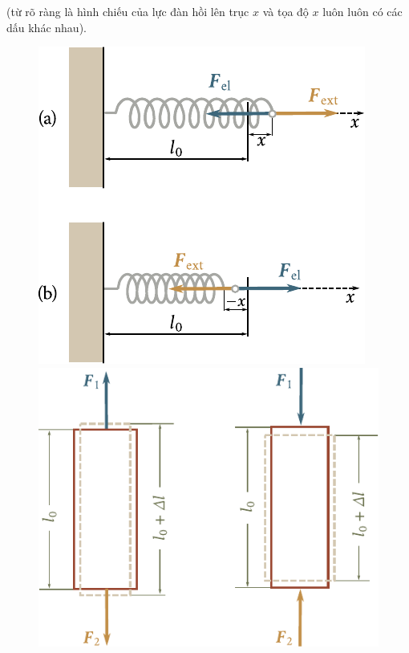 (từ  rõ ràng là hình chiếu của lực đàn hồi lên trục $x$ và tọa độ $x$ luôn luôn có các dấu khác nhau).

\begin{figure}[!htb]
	\begin{minipage}[t]{0.5\linewidth}
		\begin{center}
			\includegraphics[scale=0.75]{figures/ch_02/fig_2_5.pdf}
			\caption[]{}
			\label{fig:2_5}
		\end{center}
	\end{minipage}
	\hspace{-0.05cm}
	\begin{minipage}[t]{0.5\linewidth}
		\begin{center}
			\includegraphics[scale=0.70]{figures/ch_02/fig_2_6.pdf}
			\caption[]{}
			\label{fig:2_6}
		\end{center}
	\end{minipage}
\end{figure}

